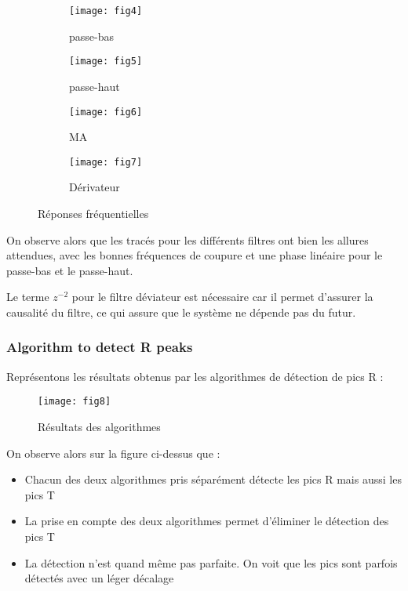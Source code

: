 \documentclass[12pt,a4paper,titlepage]{article}
\begin{document}
\begin{figure}
\begin{subfigure}{.5\textwidth}
  \centering
  \texttt{[image: fig4]}  
  \caption{passe-bas}
  \label{fig:sub-first}
\end{subfigure}
\begin{subfigure}{.5\textwidth}
  \centering
  \texttt{[image: fig5]}  
  \caption{passe-haut}
  \label{fig:sub-second}
\end{subfigure}

\newline

\begin{subfigure}{.5\textwidth}
  \centering
  \texttt{[image: fig6]}  
  \caption{MA}
  \label{fig:sub-third}
\end{subfigure}
\begin{subfigure}{.5\textwidth}
  \centering
  \texttt{[image: fig7]}  
  \caption{Dérivateur}
  \label{fig:sub-fourth}
\end{subfigure}
\caption{Réponses fréquentielles}
\label{fig:fig}
\end{figure}

On observe alors que les tracés pour les différents filtres ont bien les allures attendues, 
avec les bonnes fréquences de coupure et une phase linéaire pour le passe-bas et le 
passe-haut.

Le terme $z^{-2}$ pour le filtre déviateur est nécessaire car il permet d'assurer la
causalité du filtre, ce qui assure que le système ne dépende pas du futur.

\subsubsection{Algorithm to detect R peaks}

Représentons les résultats obtenus par les algorithmes de détection de pics R :

\begin{figure}[H]
    \caption{Résultats des algorithmes}
    \texttt{[image: fig8]}
    \centering
\end{figure}

On observe alors sur la figure ci-dessus que :

\begin{itemize}
    \item{Chacun des deux algorithmes pris séparément détecte les pics R mais aussi les
            pics T}
    \item{La prise en compte des deux algorithmes permet d'éliminer le détection des pics
            T}
    \item{La détection n'est quand même pas parfaite. On voit que les pics sont parfois
            détectés avec un léger décalage}
\end{itemize}
\end{document}
